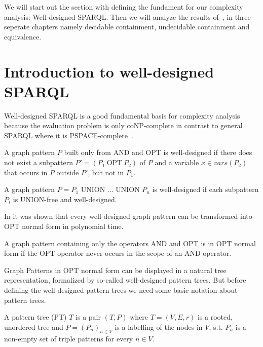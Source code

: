 We will start out the section with defining the fundament for our complexity
analysis: Well-designed SPARQL. Then we will analyze the results of~\cite{pichler2014containment}, in three seperate
chapters namely decidable containment, undecidable containment and equivalence.

\section{Introduction to well-designed SPARQL}
Well-designed SPARQL is a good fundamental basis for complexity analysis because
the evaluation problem is only coNP-complete in contrast to general SPARQL where
it is PSPACE-complete~\cite{perez2009semantics}.

\begin{definition}
	A graph pattern $P$ built only from AND and OPT is well-designed if there does
	not exist a subpattern $P' = (P_1 \  \mbox{OPT} \ P_2)$ of $P$ and a
	variable $x \in	vars(P_2)$ that occurs in $P$ outside $P'$, but not in $P_1$. 
	
	A graph pattern $P = P_1 \mbox{ UNION } \dots \mbox{ UNION } P_n$ is
	well-designed if each subpattern $P_i$ is UNION-free and well-designed.
\end{definition}

In \cite{letelier2013static} it was shown that every well-designed graph pattern
can be transformed into OPT normal form in polynomial time. 
\begin{definition}
	A graph pattern containing only the operators AND and OPT is in OPT normal form
	if the OPT operator never occurs in the scope of an AND operator. 
\end{definition}

Graph Patterns in OPT normal form can be displayed in a natural tree representation, 
formalized by so-called well-designed pattern trees. But before defining the
well-designed pattern trees we need some basic notation about pattern trees.
\begin{definition}\label{def:pt}
	A pattern tree (PT) $T$ is a pair $(T,P)$ where  $T= (V,E,r)$ is a rooted,
	unordered tree and $P = (P_n)_{n \in V}$ is a labelling of the nodes in $V$,
	s.t. $P_n$ is a non-empty set of triple patterns for every $n \in V$.  
\end{definition}

